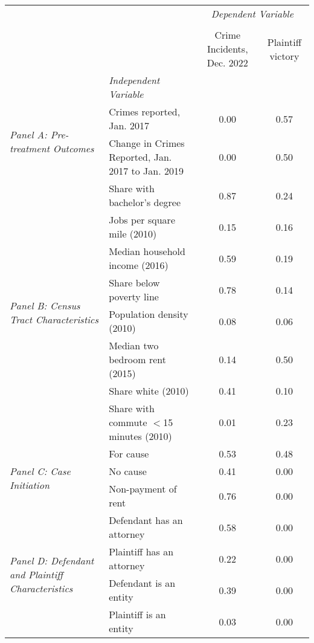 \begin{tabular}{llcc}
\toprule
 &  & \multicolumn{2}{c}{\textit{Dependent Variable}} \\
\cline{3-4}
\\
 &  & Crime Incidents, Dec. 2022 & Plaintiff victory \\
 & \emph{Independent Variable} &  &  \\
\midrule
\multirow[c]{2}{3cm}{\textit{Panel A: Pre-treatment Outcomes}} & Crimes reported, Jan. 2017 & 0.00 & 0.57 \\
 & Change in Crimes Reported, Jan. 2017 to Jan. 2019 & 0.00 & 0.50 \\
\cline{1-4}
\multirow[c]{8}{3cm}{\textit{Panel B: Census Tract Characteristics}} & Share with bachelor's degree & 0.87 & 0.24 \\
 & Jobs per square mile (2010) & 0.15 & 0.16 \\
 & Median household income (2016) & 0.59 & 0.19 \\
 & Share below poverty line & 0.78 & 0.14 \\
 & Population density (2010) & 0.08 & 0.06 \\
 & Median two bedroom rent (2015) & 0.14 & 0.50 \\
 & Share white (2010) & 0.41 & 0.10 \\
 & Share with commute $<$15 minutes (2010) & 0.01 & 0.23 \\
\cline{1-4}
\multirow[c]{3}{3cm}{\textit{Panel C: Case Initiation}} & For cause & 0.53 & 0.48 \\
 & No cause & 0.41 & 0.00 \\
 & Non-payment of rent & 0.76 & 0.00 \\
\cline{1-4}
\multirow[c]{4}{3cm}{\textit{Panel D: Defendant and Plaintiff Characteristics}} & Defendant has an attorney & 0.58 & 0.00 \\
 & Plaintiff has an attorney & 0.22 & 0.00 \\
 & Defendant is an entity & 0.39 & 0.00 \\
 & Plaintiff is an entity & 0.03 & 0.00 \\
\cline{1-4}
\bottomrule
\end{tabular}
